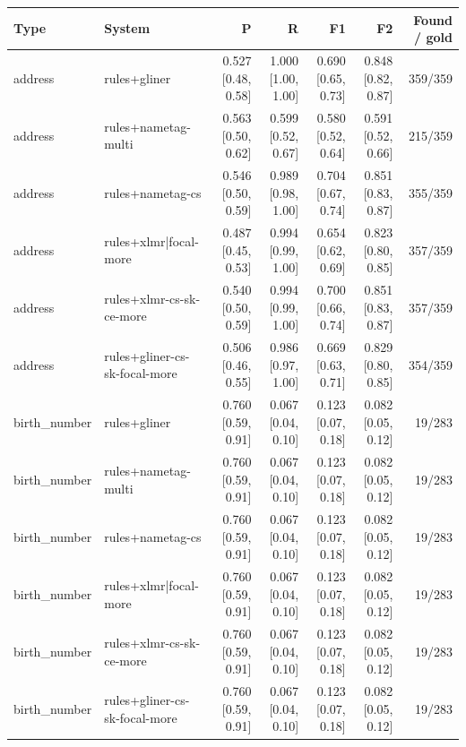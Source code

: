 \providecommand{\ci}[2]{{\scriptsize [#1, #2]}}

\begin{table}[htbp]
\centering
\small
\begin{tabular}{llrrrrr}
\toprule
Type & System & P & R & F1 & F2 & Found / gold \\
\midrule
address & rules+gliner & 0.527 \ci{0.48}{0.58} & 1.000 \ci{1.00}{1.00} & 0.690 \ci{0.65}{0.73} & 0.848 \ci{0.82}{0.87} & 359/359 \\
address & rules+nametag-multi & 0.563 \ci{0.50}{0.62} & 0.599 \ci{0.52}{0.67} & 0.580 \ci{0.52}{0.64} & 0.591 \ci{0.52}{0.66} & 215/359 \\
address & rules+nametag-cs & 0.546 \ci{0.50}{0.59} & 0.989 \ci{0.98}{1.00} & 0.704 \ci{0.67}{0.74} & 0.851 \ci{0.83}{0.87} & 355/359 \\
address & rules+xlmr|focal-more & 0.487 \ci{0.45}{0.53} & 0.994 \ci{0.99}{1.00} & 0.654 \ci{0.62}{0.69} & 0.823 \ci{0.80}{0.85} & 357/359 \\
address & rules+xlmr-cs-sk-ce-more & 0.540 \ci{0.50}{0.59} & 0.994 \ci{0.99}{1.00} & 0.700 \ci{0.66}{0.74} & 0.851 \ci{0.83}{0.87} & 357/359 \\
address & rules+gliner-cs-sk-focal-more & 0.506 \ci{0.46}{0.55} & 0.986 \ci{0.97}{1.00} & 0.669 \ci{0.63}{0.71} & 0.829 \ci{0.80}{0.85} & 354/359 \\
birth\_number & rules+gliner & 0.760 \ci{0.59}{0.91} & 0.067 \ci{0.04}{0.10} & 0.123 \ci{0.07}{0.18} & 0.082 \ci{0.05}{0.12} & 19/283 \\
birth\_number & rules+nametag-multi & 0.760 \ci{0.59}{0.91} & 0.067 \ci{0.04}{0.10} & 0.123 \ci{0.07}{0.18} & 0.082 \ci{0.05}{0.12} & 19/283 \\
birth\_number & rules+nametag-cs & 0.760 \ci{0.59}{0.91} & 0.067 \ci{0.04}{0.10} & 0.123 \ci{0.07}{0.18} & 0.082 \ci{0.05}{0.12} & 19/283 \\
birth\_number & rules+xlmr|focal-more & 0.760 \ci{0.59}{0.91} & 0.067 \ci{0.04}{0.10} & 0.123 \ci{0.07}{0.18} & 0.082 \ci{0.05}{0.12} & 19/283 \\
birth\_number & rules+xlmr-cs-sk-ce-more & 0.760 \ci{0.59}{0.91} & 0.067 \ci{0.04}{0.10} & 0.123 \ci{0.07}{0.18} & 0.082 \ci{0.05}{0.12} & 19/283 \\
birth\_number & rules+gliner-cs-sk-focal-more & 0.760 \ci{0.59}{0.91} & 0.067 \ci{0.04}{0.10} & 0.123 \ci{0.07}{0.18} & 0.082 \ci{0.05}{0.12} & 19/283 \\

\end{tabular}
\end{table}
